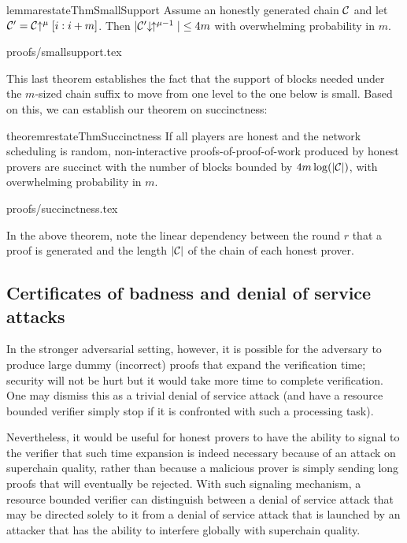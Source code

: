 \begin{restatable}{lemma}{restateThmSmallSupport}
    \label{lem.small-support}
    Assume an honestly generated chain $\mathcal{C}$ and let $\mathcal{C}' =
    \mathcal{C}\negthickspace\uparrow^\mu[i:i + m]$. Then $|\mathcal{C}'\negthickspace\downarrow\,\negthickspace\uparrow^{\mu - 1}|
    \leq 4m$ with overwhelming probability in $m$.
\end{restatable}
{proofs/smallsupport.tex}

This last theorem establishes the fact that the support of blocks needed under
the $m$-sized chain suffix to move from one level to the one below is small.
Based on this, we can establish our theorem on succinctness:

\begin{restatable}{theorem}{restateThmSuccinctness}
    \label{thm.succinctness}
    If all players are honest and the network scheduling is random,
    non-interactive proofs-of-proof-of-work produced by honest provers are
    succinct with the number of blocks bounded by $4m \log(|\mathcal{C}|)$, with
    overwhelming probability in $m$.
\end{restatable}
{proofs/succinctness.tex}

In the above theorem, note the linear dependency between the round $r$ that a
proof is generated and the length $|\mathcal{C}|$ of the chain of each honest prover.

\subsection{Certificates of badness and denial of service attacks}
In the stronger adversarial setting, however, it is possible for the adversary
to produce large dummy (incorrect) proofs that expand the verification time;
security will not be hurt but it would take more time to complete verification.
One may dismiss this as a trivial denial of service attack (and have a resource
bounded verifier simply stop  if it is confronted with such a processing task).

Nevertheless, it would be useful for honest provers to have the ability to
signal to the verifier that such time expansion is indeed necessary because of
an attack on superchain quality, rather than because a malicious prover is
simply sending long proofs that will eventually be rejected. With such signaling
mechanism, a resource bounded verifier can distinguish between a denial of
service attack that may be directed solely to it from  a denial of service
attack that  is launched by an attacker that has the ability to  interfere
globally with superchain quality.

